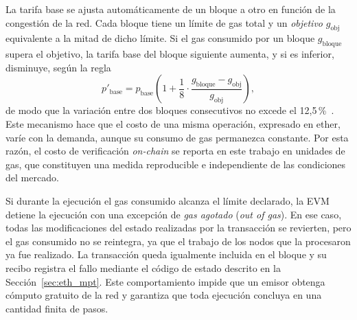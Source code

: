 La tarifa base se ajusta automáticamente de un bloque a otro en función de la congestión de la
red. Cada bloque tiene un límite de gas total y un \textit{objetivo} $g_{\mathrm{obj}}$
equivalente a la mitad de dicho límite. Si el gas consumido por un bloque $g_{\mathrm{bloque}}$
supera el objetivo, la tarifa base del bloque siguiente aumenta, y si es inferior, disminuye,
según la regla
\begin{equation}
	\label{eq:gas_base}
	p'_{\mathrm{base}} = p_{\mathrm{base}} \left(1 + \frac{1}{8} \cdot
	\frac{g_{\mathrm{bloque}} - g_{\mathrm{obj}}}{g_{\mathrm{obj}}}\right),
\end{equation}
de modo que la variación entre dos bloques consecutivos no excede el 12,5\,\%~\cite{eip1559}.
Este mecanismo hace que el costo de una misma operación, expresado en ether, varíe con la
demanda, aunque su consumo de gas permanezca constante. Por esta razón, el costo de verificación
\textit{on-chain} se reporta en este trabajo en unidades de gas, que constituyen una medida
reproducible e independiente de las condiciones del mercado.

Si durante la ejecución el gas consumido alcanza el límite declarado, la EVM detiene la
ejecución con una excepción de \textit{gas agotado} (\textit{out of gas}). En ese caso, todas las
modificaciones del estado realizadas por la transacción se revierten, pero el gas consumido no se
reintegra, ya que el trabajo de los nodos que la procesaron ya fue realizado. La transacción
queda igualmente incluida en el bloque y su recibo registra el fallo mediante el código de
estado descrito en la Sección~\ref{sec:eth_mpt}. Este comportamiento impide que un emisor obtenga
cómputo gratuito de la red y garantiza que toda ejecución concluya en una cantidad finita de
pasos.

